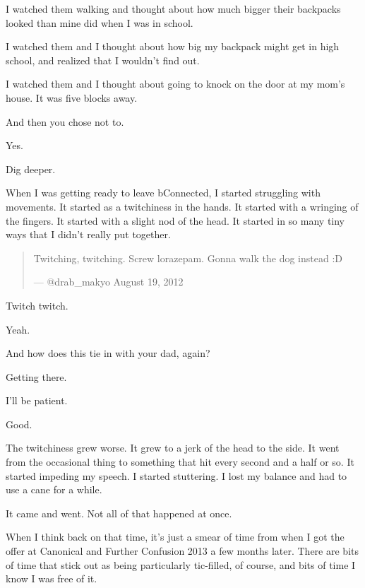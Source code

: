 \begin{paracol}{2}
\begin{leftcolumn}
I watched them walking and thought about how much bigger their backpacks looked than mine did when I was in school.

I watched them and I thought about how big my backpack might get in high school, and realized that I wouldn't find out.

I watched them and I thought about going to knock on the door at my mom's house. It was five blocks away.

\begin{ally}
And then you chose not to.
\end{ally}
Yes.

\begin{ally}
Dig deeper.
\end{ally}
\newpage

\noindent When I was getting ready to leave bConnected, I started struggling with movements. It started as a twitchiness in the hands. It started with a wringing of the fingers. It started with a slight nod of the head. It started in so many tiny ways that I didn't really put together.

\begin{quotation}
\noindent Twitching, twitching. Screw lorazepam. Gonna walk the dog instead :D

--- @drab\_makyo August 19, 2012
\end{quotation}

\begin{ally}
Twitch twitch.
\end{ally}
Yeah.

\begin{ally}
And how does this tie in with your dad, again?
\end{ally}
Getting there.

\begin{ally}
I'll be patient.
\end{ally}
Good.

The twitchiness grew worse. It grew to a jerk of the head to the side. It went from the occasional thing to something that hit every second and a half or so. It started impeding my speech. I started stuttering. I lost my balance and had to use a cane for a while.

\begin{ally}
It came and went. Not all of that happened at once.
\end{ally}
When I think back on that time, it's just a smear of time from when I got the offer at Canonical and Further Confusion 2013 a few months later. There are bits of time that stick out as being particularly tic-filled, of course, and bits of time I know I was free of it.


\end{leftcolumn}
\end{paracol}
